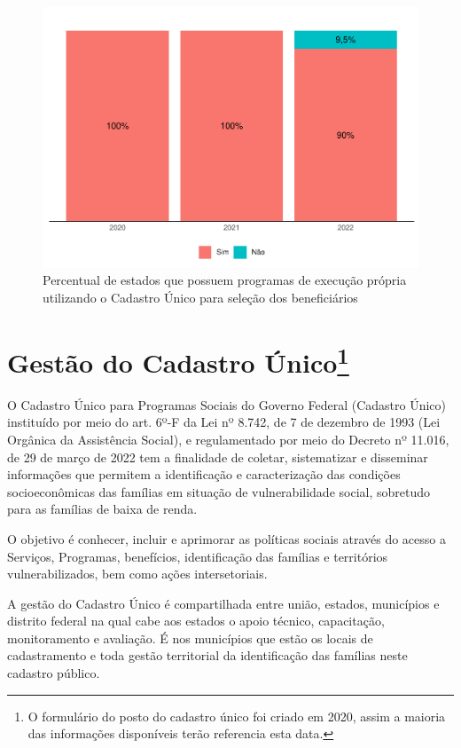 \documentclass[
  brazilian]{report}
\begin{document}
\begin{figure}
\includegraphics{Censo-SUAS-2022_files/figure-latex/uf_usa_cad-1} \caption[Percentual de estados que possuem programas de execução própria utilizando o Cadastro Único para seleção dos beneficiários]{Percentual de estados que possuem programas de execução própria utilizando o Cadastro Único para seleção dos beneficiários}\label{fig:uf_usa_cad}
\end{figure}

\section[Gestão do Cadastro Único]{Gestão do Cadastro Único\footnote{O formulário do posto do cadastro único foi criado em 2020, assim a maioria das informações disponíveis terão referencia esta data.}}

O Cadastro Único para Programas Sociais do Governo Federal (Cadastro
Único) instituído por meio do art. 6º-F da Lei nº 8.742, de 7 de
dezembro de 1993 (Lei Orgânica da Assistência Social), e regulamentado
por meio do Decreto nº 11.016, de 29 de março de 2022 tem a finalidade
de coletar, sistematizar e disseminar informações que permitem a
identificação e caracterização das condições socioeconômicas das
famílias em situação de vulnerabilidade social, sobretudo para as
famílias de baixa de renda.

O objetivo é conhecer, incluir e aprimorar as políticas sociais através
do acesso a Serviços, Programas, benefícios, identificação das famílias
e territórios vulnerabilizados, bem como ações intersetoriais.

A gestão do Cadastro Único é compartilhada entre união, estados,
municípios e distrito federal na qual cabe aos estados o apoio técnico,
capacitação, monitoramento e avaliação. É nos municípios que estão os
locais de cadastramento e toda gestão territorial da identificação das
famílias neste cadastro público.
\end{document}
